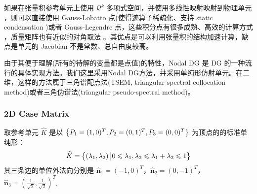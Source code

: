 如果在张量积参考单元上使用 \(\mathscr{Q}^k\) 多项式空间，并使用多线性映射映射到物理单元 \cite{10.1090/s0025-5718-02-01439-4}，则可以直接使用 Gauss-Lobatto 点(使得迹算子稀疏化、支持 static condensation \cite{10.2514/3.2874})或者 Gauss-Legendre 点，这些积分点有很多成熟、高效的计算方式 \cite{10.1137/140954969, 10.1137/S1064827500379690, 10.1017/S0962492920000045}，质量矩阵也有近似的对角取法 \cite{10.1002/fld.2376}。其优点是可以利用张量积的结构加速计算，缺点是单元的 Jacobian 不是常数、总自由度较高。


由于其便于理解(所有的待解的变量都是点值)的特性，Nodal DG \cite{10.1007/978-0-387-72067-8} 是 DG 的一种流行的具体实现方法。我们这里采用Nodal DG方法，并采用单纯形仿射单元。在二维，这样的方法属于三角谱配点法(TSEM, triangular spectral collocation method)或者三角伪谱法(triangular pseudo-spectral method)。


\subsubsection{2D Case Matrix}

取参考单元 \(\widehat{K}\) 是以 \(\left\{P_1 = (1,0)^T, P_2 = (0,1)^T, P_3 = (0,0)^T\right\}\) 为顶点的的标准单纯形：
\begin{equation}
	\widehat{K} = \left\{\left(\lambda_1, \lambda_2\right) \big| 0\leqslant \lambda_1, \lambda_2 \leqslant \lambda_1 + \lambda_2 \leqslant 1\right\}
\end{equation}
其三条边的单位外法向分别是 \(\widehat{\bm n}_1 = (-1, 0)^T\)，\(\widehat{\bm n}_2 = (0, -1)^T\)，\(\widehat{\bm n}_3 = (\frac{1}{\sqrt{2}}, \frac{1}{\sqrt{2}})^T\).

